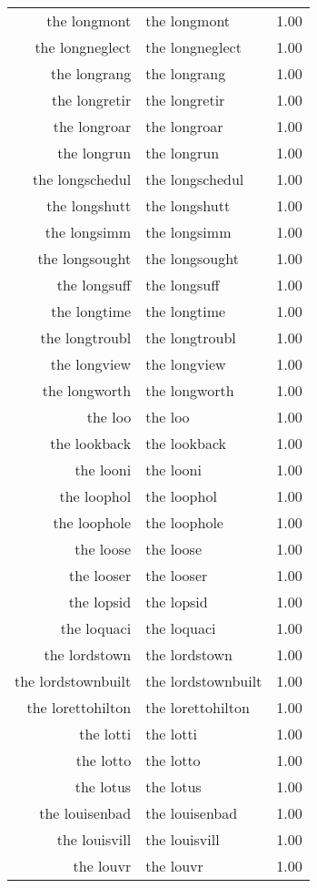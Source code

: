 \begin{table}[ht]
\begin{tabular}{rlr}
  the longmont & the longmont & 1.00 \\ 
  the longneglect & the longneglect & 1.00 \\ 
  the longrang & the longrang & 1.00 \\ 
  the longretir & the longretir & 1.00 \\ 
  the longroar & the longroar & 1.00 \\ 
  the longrun & the longrun & 1.00 \\ 
  the longschedul & the longschedul & 1.00 \\ 
  the longshutt & the longshutt & 1.00 \\ 
  the longsimm & the longsimm & 1.00 \\ 
  the longsought & the longsought & 1.00 \\ 
  the longsuff & the longsuff & 1.00 \\ 
  the longtime & the longtime & 1.00 \\ 
  the longtroubl & the longtroubl & 1.00 \\ 
  the longview & the longview & 1.00 \\ 
  the longworth & the longworth & 1.00 \\ 
  the loo & the loo & 1.00 \\ 
  the lookback & the lookback & 1.00 \\ 
  the looni & the looni & 1.00 \\ 
  the loophol & the loophol & 1.00 \\ 
  the loophole & the loophole & 1.00 \\ 
  the loose & the loose & 1.00 \\ 
  the looser & the looser & 1.00 \\ 
  the lopsid & the lopsid & 1.00 \\ 
  the loquaci & the loquaci & 1.00 \\ 
  the lordstown & the lordstown & 1.00 \\ 
  the lordstownbuilt & the lordstownbuilt & 1.00 \\ 
  the lorettohilton & the lorettohilton & 1.00 \\ 
  the lotti & the lotti & 1.00 \\ 
  the lotto & the lotto & 1.00 \\ 
  the lotus & the lotus & 1.00 \\ 
  the louisenbad & the louisenbad & 1.00 \\ 
  the louisvill & the louisvill & 1.00 \\ 
  the louvr & the louvr & 1.00 \\ 

\end{tabular}
\end{table}
